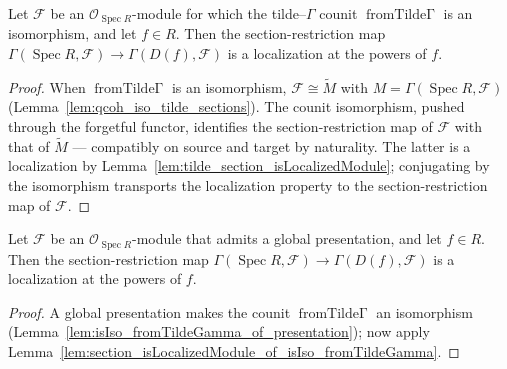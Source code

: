 \begin{lemma}
  \label{lem:section_isLocalizedModule_of_isIso_fromTildeGamma}
  Let \(\mathcal{F}\) be an \(\mathcal{O}_{\operatorname{Spec} R}\)-module for which the
  tilde--\(\Gamma\) counit \(\operatorname{fromTilde\Gamma}\) is an isomorphism, and let \(f \in R\).
  Then the section-restriction map \(\Gamma(\operatorname{Spec} R, \mathcal{F}) \to \Gamma(D(f),
  \mathcal{F})\) is a localization at the powers of \(f\).
\end{lemma}
\begin{proof}
  \leanok
  When \(\operatorname{fromTilde\Gamma}\) is an isomorphism, \(\mathcal{F} \cong \widetilde{M}\) with
  \(M = \Gamma(\operatorname{Spec} R, \mathcal{F})\) (Lemma~\ref{lem:qcoh_iso_tilde_sections}). The
  counit isomorphism, pushed through the forgetful functor, identifies the section-restriction map of
  \(\mathcal{F}\) with that of \(\widetilde{M}\) — compatibly on source and target by naturality. The
  latter is a localization by Lemma~\ref{lem:tilde_section_isLocalizedModule}; conjugating by the
  isomorphism transports the localization property to the section-restriction map of \(\mathcal{F}\).
\end{proof}

\begin{lemma}
  \label{lem:section_isLocalizedModule_of_presentation}
  Let \(\mathcal{F}\) be an \(\mathcal{O}_{\operatorname{Spec} R}\)-module that admits a global
  presentation, and let \(f \in R\). Then the section-restriction map
  \(\Gamma(\operatorname{Spec} R, \mathcal{F}) \to \Gamma(D(f), \mathcal{F})\) is a localization at the
  powers of \(f\).
\end{lemma}
\begin{proof}
    \leanok
  A global presentation makes the counit \(\operatorname{fromTilde\Gamma}\) an isomorphism
  (Lemma~\ref{lem:isIso_fromTildeGamma_of_presentation}); now apply
  Lemma~\ref{lem:section_isLocalizedModule_of_isIso_fromTildeGamma}.
\end{proof}

